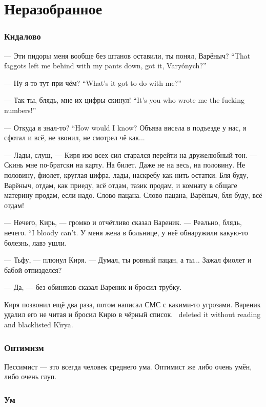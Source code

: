 \chapter*{Неразобранное}

\subsection{Кидалово}

{--- Эти пидоры меня вообще без штанов оставили, ты понял, Варёныч?}
{``That faggots left me behind with my pants down, got it, Vary\'onych?''}

{--- Ну я-то тут при чём?}
{``What's it got to do with me?''}

{--- Так ты, блядь, мне их цифры скинул!}
{``It's you who wrote me the fucking numbers!''}

{--- Откуда я знал-то?}
{``How would I know?}
Объява висела в подъезде у нас, я сфотал и всё, не звонил, не смотрел чё как...

--- Лады, слуш, --- Киря изо всех сил старался перейти на дружелюбный тон.
--- Скинь мне по-братски на карту.
На билет.
Даже не на весь, на половину.
Не половину, фиолет, круглая цифра, лады, наскребу как-нить остатки.
Бля буду, Варёныч, отдам, как приеду, всё отдам, тазик продам, и комнату в общаге материну продам, если надо.
Слово пацана.
Слово пацана, Варёныч, бля буду, всё отдам!

--- Нечего, Кирь, --- громко и отчётливо сказал Вареник.
{--- Реально, блядь, нечего.}
{``I bloody can't.}
У меня жена в больнице, у неё обнаружили какую-то болезнь, лавэ ушли.

--- Тьфу, --- плюнул Киря.
--- Думал, ты ровный пацан, а ты...
Зажал фиолет и бабой отпизделся?

--- Да, --- без обиняков сказал Вареник и бросил трубку.

Киря позвонил ещё два раза, потом написал СМС с какими-то угрозами.
{Вареник удалил его не читая и бросил Кирю в чёрный список.}
{\Varenik\ deleted it without reading and blacklisted K\'{\i}rya.}

\subsection{Оптимизм}

Пессимист --- это всегда человек среднего ума.
Оптимист же либо очень умён, либо очень глуп.

\subsection{Ум}

